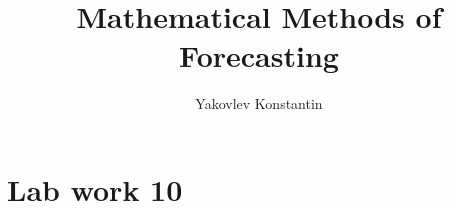 \documentclass[a4paper,14pt]{article}
\title{Mathematical Methods of Forecasting}
\date{}
\author{Yakovlev Konstantin}
\numberwithin{equation}{section}
\begin{document}
    \maketitle
    \tableofcontents
    
    \clearpage
    \section{Lab work 10} %
    {} %
    

    \clearpage
    \printbibliography
\end{document}
